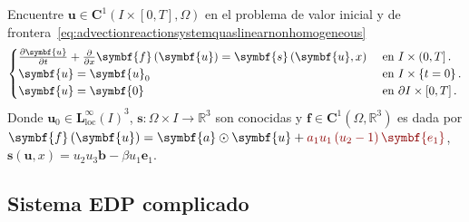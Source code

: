 Encuentre
\begin{math}
	\symbf{u}\in
	\symbf{C}^{1}\left(I\times\left[0,T\right],\Omega\right)
\end{math}
en el problema de valor inicial y de frontera~\eqref{eq:advectionreactionsystemquaslinearnonhomogeneous}
\begin{equation}\label{eq:advectionreactionsystemquaslinearnonhomogeneous}
	\begin{cases}
		\diffp{\symbf{u}}{t}+\diffp{}{x}\symbf{f}\left(\symbf{u}\right)=
		\symbf{s}\left(\symbf{u},x\right) & \text{ en }I\times\left(0,T\right].          \\
		\symbf{u}                                                      =
		\symbf{u}_{0}                     & \text{ en }I\times\left\{t=0\right\}.        \\
		\symbf{u}                                                       =
		\symbf{0}                         & \text{ en }\partial I\times\left[0,T\right].
	\end{cases}
\end{equation}
Donde
\begin{math}
	\symbf{u}_{0}\in
	{\symbf{L}^{\infty}_{\text{loc}}\left(I\right)}^{3}
\end{math},
\begin{math}
	\symbf{s}\colon\Omega\times I\to
	\mathbb{R}^{3}
\end{math}
son conocidas y
\begin{math}
	\symbf{f}\in
	\symbf{C}^{1}\left(\Omega,\mathbb{R}^{3}\right)
\end{math}
es dada por
\begin{math}
	\symbf{f}\left(\symbf{u}\right)=
	\symbf{a}\odot\symbf{u}+
	\mathcolor{DarkRed}{a_{1}u_{1}\left(u_{2}-1\right)\symbf{e_{1}}}
\end{math},
\begin{math}
	\symbf{s}\left(\symbf{u},x\right)=
	u_{2}u_{3}\symbf{b}-\beta u_{1}\symbf{e}_{1}
\end{math}.

\subsection*{\color{DarkRed}Sistema EDP complicado}

